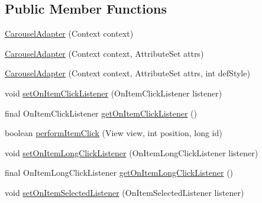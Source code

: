 \subsection*{Public Member Functions}
\begin{DoxyCompactItemize}
\item 
\hyperlink{classcom_1_1zia_1_1freshdocs_1_1widget_1_1fileexplorer_1_1carousel_1_1_carousel_adapter_3_01_t_01extends_01_adapter_01_4_a83aef3f3a9694fbc32954c4872b85911}{Carousel\-Adapter} (Context context)
\item 
\hyperlink{classcom_1_1zia_1_1freshdocs_1_1widget_1_1fileexplorer_1_1carousel_1_1_carousel_adapter_3_01_t_01extends_01_adapter_01_4_a630b39ec1b6ee172310898523a33ce68}{Carousel\-Adapter} (Context context, Attribute\-Set attrs)
\item 
\hyperlink{classcom_1_1zia_1_1freshdocs_1_1widget_1_1fileexplorer_1_1carousel_1_1_carousel_adapter_3_01_t_01extends_01_adapter_01_4_aded4e835cf37751dfef3cf999cd3ab43}{Carousel\-Adapter} (Context context, Attribute\-Set attrs, int def\-Style)
\item 
void \hyperlink{classcom_1_1zia_1_1freshdocs_1_1widget_1_1fileexplorer_1_1carousel_1_1_carousel_adapter_3_01_t_01extends_01_adapter_01_4_aff8397411306359d0172f9268c89a160}{set\-On\-Item\-Click\-Listener} (On\-Item\-Click\-Listener listener)
\item 
final On\-Item\-Click\-Listener \hyperlink{classcom_1_1zia_1_1freshdocs_1_1widget_1_1fileexplorer_1_1carousel_1_1_carousel_adapter_3_01_t_01extends_01_adapter_01_4_a5c2df7494ab7822c4cc2ab9108e780d2}{get\-On\-Item\-Click\-Listener} ()
\item 
boolean \hyperlink{classcom_1_1zia_1_1freshdocs_1_1widget_1_1fileexplorer_1_1carousel_1_1_carousel_adapter_3_01_t_01extends_01_adapter_01_4_ac103209f6c41c6ba8a0c2392a96260c3}{perform\-Item\-Click} (View view, int position, long id)
\item 
void \hyperlink{classcom_1_1zia_1_1freshdocs_1_1widget_1_1fileexplorer_1_1carousel_1_1_carousel_adapter_3_01_t_01extends_01_adapter_01_4_a956f72eb8d196b05aa62f23a0e48b7e4}{set\-On\-Item\-Long\-Click\-Listener} (On\-Item\-Long\-Click\-Listener listener)
\item 
final On\-Item\-Long\-Click\-Listener \hyperlink{classcom_1_1zia_1_1freshdocs_1_1widget_1_1fileexplorer_1_1carousel_1_1_carousel_adapter_3_01_t_01extends_01_adapter_01_4_a5ab4e0147fc0bc4f156bbcbc5bbee272}{get\-On\-Item\-Long\-Click\-Listener} ()
\item 
void \hyperlink{classcom_1_1zia_1_1freshdocs_1_1widget_1_1fileexplorer_1_1carousel_1_1_carousel_adapter_3_01_t_01extends_01_adapter_01_4_a41bd7628310e50bcb2fb098edb925078}{set\-On\-Item\-Selected\-Listener} (On\-Item\-Selected\-Listener listener)

\end{DoxyCompactItemize}
